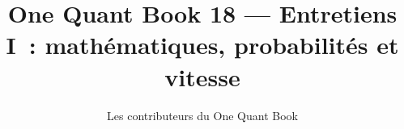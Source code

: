 \documentclass[11pt,a4paper,twoside,openany]{book}
\title{One Quant Book 18 --- Entretiens I~: mathématiques, probabilités et vitesse}
\author{Les contributeurs du One Quant Book}
\date{\bookdate}
\begin{document}
\frontmatter



\tableofcontents

\mainmatter


\appendix
\part{\omsolutionspart}


\backmatter
\printindex
\end{document}
